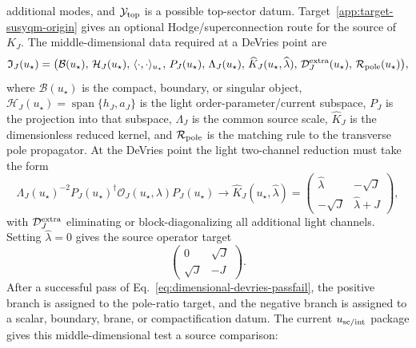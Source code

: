 additional modes, and \(\mathcal Y_{\rm top}\) is a possible top-sector
datum.  Target~\ref{app:target-susyqm-origin} gives an optional
Hodge/superconnection route for the source of \(K_J\).  The middle-dimensional
data required at a DeVries point are
\begin{equation}
  \mathfrak I_J(u_\star)
  =
  \big(
  \mathcal B(u_\star),\,
  \mathcal H_J(u_\star),\,
  \langle\cdot,\cdot\rangle_{u_\star},\,
  P_J(u_\star),\,
  \Lambda_J(u_\star),\,
  \widehat K_J(u_\star,\widehat\lambda),\,
  \mathcal D_J^{\rm extra}(u_\star),\,
  \mathcal R_{\rm pole}(u_\star)
  \big),
  \label{eq:middle-dimensional-data}
\end{equation}
where \(\mathcal B(u_\star)\) is the compact, boundary, or singular object,
\(\mathcal H_J(u_\star)=\operatorname{span}\{h_J,a_J\}\) is the light
order-parameter/current subspace, \(P_J\) is the projection into that subspace,
\(\Lambda_J\) is the common source scale, \(\widehat K_J\) is the dimensionless
reduced kernel, and \(\mathcal R_{\rm pole}\) is the matching rule to the transverse pole
propagator.  At the DeVries point the light two-channel reduction must take the
form
\begin{equation}
  \Lambda_J(u_\star)^{-2}
  P_J(u_\star)^\dagger
  \mathcal O_J(u_\star,\lambda)
  P_J(u_\star)
  \longrightarrow
  \widehat K_J(u_\star,\widehat\lambda)
  =
  \begin{pmatrix}
  \widehat\lambda&-\sqrt J\\
  -\sqrt J&\widehat\lambda+J
  \end{pmatrix},
  \label{eq:dimensional-devries-passfail}
\end{equation}
with \(\mathcal D_J^{\rm extra}\) eliminating or block-diagonalizing all
additional light channels.  Setting \(\widehat\lambda=0\) gives the source
operator target
\begin{equation}
  \begin{pmatrix}
  0&\sqrt J\\
  \sqrt J&-J
  \end{pmatrix}.
  \label{eq:dimensional-devries-target}
\end{equation}
After a successful pass of Eq.~\eqref{eq:dimensional-devries-passfail}, the
positive branch is assigned to the pole-ratio target, and the negative branch is
assigned to a scalar, boundary, brane, or compactification datum.
The current \(u_{\rm sc/int}\) package gives this middle-dimensional test a
source comparison:

